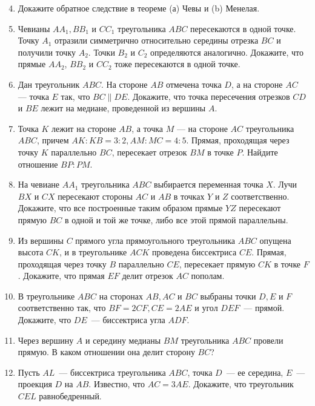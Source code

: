 \documentclass{article}
\begin{document}
\begin{enumerate}[label*=\protect\fbox{\arabic{enumi}}]
\setcounter{enumi}{3}

\item Докажите обратное следствие в теореме (а) Чевы и (b) Менелая.

\item Чевианы $AA_1, BB_1$ и $CC_1$ треугольника $ABC$ пересекаются в одной точке. Точку $A_1$ отразили симметрично относительно середины отрезка $BC$ и получили точку $A_2$. Точки $B_2$ и $C_2$ определяются аналогично. Докажите, что прямые $AA_2$, $BB_2$ и $CC_2$ тоже пересекаются в одной точке.

\item Дан треугольник $ABC$. На стороне $AB$ отмечена точка $D$, а на стороне $AC$ — точка $E$ так, что $BC \parallel DE$. Докажите, что точка пересечения отрезков $CD$ и $BE$ лежит на медиане, проведенной из вершины $A$.

\item Точка $K$ лежит на стороне $AB$, а точка $M$ — на стороне $AC$ треугольника $ABC$, причем $AK : KB = 3 : 2, AM : MC = 4 : 5$. Прямая, проходящая через точку $K$ параллельно $BC$, пересекает отрезок $BM$ в точке $P$. Найдите отношение $BP : PM$.

\item На чевиане $AA_1$ треугольника $ABC$ выбирается переменная точка $X$. Лучи $BX$ и $CX$ пересекают стороны $AC$ и $AB$ в точках $Y$ и $Z$ соответственно. Докажите, что все построенные таким образом прямые $YZ$ пересекают прямую $BC$ в одной и той же точке, либо все этой прямой параллельны.

\item Из вершины $C$ прямого угла прямоугольного треугольника $ABC$ опущена высота $CK$, и в треугольнике $ACK$ проведена биссектриса $CE$. Прямая, проходящая через точку $B$ параллельно $CE$, пересекает прямую $CK$ в точке $F$. Докажите, что прямая $EF$ делит отрезок $AC$ пополам.

\item В треугольнике $ABC$ на сторонах $AB,AC$ и $BC$ выбраны точки $D,E$ и $F$ соответственно так, что $BF = 2CF, CE = 2AE$ и угол $DEF$~--- прямой. Докажите, что $DE$~--- биссектриса угла $ADF$.

\item Через вершину $A$ и середину медианы $BM$ треугольника $ABC$ провели прямую. В каком отношении она делит сторону $BC$?

\item Пусть $AL$~--- биссектриса треугольника $ABC$, точка $D$~--- ее середина, $E$~--- проекция $D$ на $AB$. Известно, что $AC = 3AE$. Докажите, что треугольник $CEL$ равнобедренный.


\end{enumerate}
\end{document}
